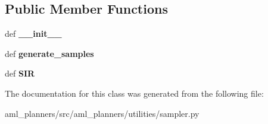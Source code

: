 \subsection*{Public Member Functions}
\begin{DoxyCompactItemize}
\item 
\hypertarget{classaml__planners_1_1utilities_1_1sampler_1_1_sampler_ac4fa83eaaa518a343e16d14ed6e2377c}{def {\bfseries \-\_\-\-\_\-init\-\_\-\-\_\-}}\label{classaml__planners_1_1utilities_1_1sampler_1_1_sampler_ac4fa83eaaa518a343e16d14ed6e2377c}

\item 
\hypertarget{classaml__planners_1_1utilities_1_1sampler_1_1_sampler_a4df1f5960f68eeb226d6a8ed5e4f2abd}{def {\bfseries generate\-\_\-samples}}\label{classaml__planners_1_1utilities_1_1sampler_1_1_sampler_a4df1f5960f68eeb226d6a8ed5e4f2abd}

\item 
\hypertarget{classaml__planners_1_1utilities_1_1sampler_1_1_sampler_a65c808e80e6f025e99a02d9976759d48}{def {\bfseries S\-I\-R}}\label{classaml__planners_1_1utilities_1_1sampler_1_1_sampler_a65c808e80e6f025e99a02d9976759d48}

\end{DoxyCompactItemize}


The documentation for this class was generated from the following file\-:\begin{DoxyCompactItemize}
\item 
aml\-\_\-planners/src/aml\-\_\-planners/utilities/sampler.\-py\end{DoxyCompactItemize}
